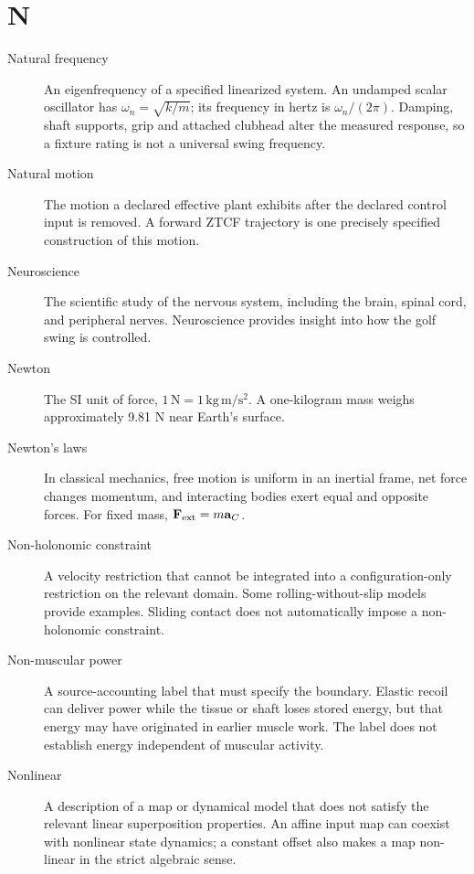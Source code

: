 \section*{N}
\begin{description}

\item[Natural frequency] An eigenfrequency of a specified linearized system. An undamped scalar oscillator has $\omega_n=\sqrt{k/m}$; its frequency in hertz is $\omega_n/(2\pi)$. Damping, shaft supports, grip and attached clubhead alter the measured response, so a fixture rating is not a universal swing frequency.

\item[Natural motion] The motion a declared effective plant exhibits after the declared control input is removed. A forward ZTCF trajectory is one precisely specified construction of this motion.

\item[Neuroscience] The scientific study of the nervous system, including the brain, spinal cord, and peripheral nerves. Neuroscience provides insight into how the golf swing is controlled.

\item[Newton] The SI unit of force, $1\,\mathrm{N}=1\,\mathrm{kg\,m/s^2}$. A one-kilogram mass weighs approximately 9.81 N near Earth's surface.

\item[Newton's laws] In classical mechanics, free motion is uniform in an inertial frame, net force changes momentum, and interacting bodies exert equal and opposite forces. For fixed mass, $\mathbf{F}_{\rm ext}=m\mathbf{a}_C$.

\item[Non-holonomic constraint] A velocity restriction that cannot be integrated into a configuration-only restriction on the relevant domain. Some rolling-without-slip models provide examples. Sliding contact does not automatically impose a non-holonomic constraint.

\item[Non-muscular power] A source-accounting label that must specify the boundary. Elastic recoil can deliver power while the tissue or shaft loses stored energy, but that energy may have originated in earlier muscle work. The label does not establish energy independent of muscular activity.

\item[Nonlinear] A description of a map or dynamical model that does not satisfy the relevant linear superposition properties. An affine input map can coexist with nonlinear state dynamics; a constant offset also makes a map non-linear in the strict algebraic sense.


\end{description}
